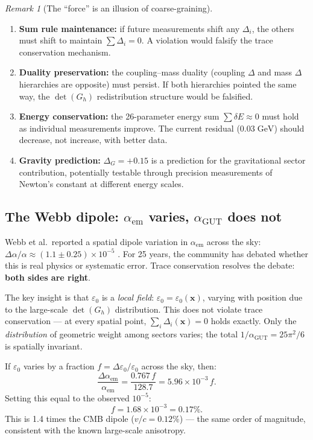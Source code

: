\documentclass[12pt]{article}
\theoremstyle{remark}
\newtheorem{remark}[theorem]{Remark}
\theoremstyle{definition}
\begin{document}
\begin{remark}[The ``force'' is an illusion of coarse-graining]
\begin{enumerate}
\item \textbf{Sum rule maintenance:} if future measurements shift any $\Delta_i$, the others must shift to maintain $\sum \Delta_i = 0$. A violation would falsify the trace conservation mechanism.

\item \textbf{Duality preservation:} the coupling--mass duality (coupling $\Delta$ and mass $\Delta$ hierarchies are opposite) must persist. If both hierarchies pointed the same way, the $\det(G_h)$ redistribution structure would be falsified.

\item \textbf{Energy conservation:} the 26-parameter energy sum $\sum \delta E \approx 0$ must hold as individual measurements improve. The current residual ($0.03\;\text{GeV}$) should decrease, not increase, with better data.

\item \textbf{Gravity prediction:} $\Delta_G = +0.15$ is a prediction for the gravitational sector contribution, potentially testable through precision measurements of Newton's constant at different energy scales.
\end{enumerate}

\subsection{The Webb dipole: $\alpha_\text{em}$ varies, $\alpha_\text{GUT}$ does not}

Webb et al.\ reported a spatial dipole variation in $\alpha_\text{em}$ across the sky: $\Delta\alpha/\alpha \approx (1.1 \pm 0.25) \times 10^{-5}$ \cite{Webb}. For 25 years, the community has debated whether this is real physics or systematic error. Trace conservation resolves the debate: \textbf{both sides are right}.

The key insight is that $\varepsilon_0$ is a \emph{local field}: $\varepsilon_0 = \varepsilon_0(\mathbf{x})$, varying with position due to the large-scale $\det(G_h)$ distribution. This does not violate trace conservation --- at every spatial point, $\sum_i \Delta_i(\mathbf{x}) = 0$ holds exactly. Only the \emph{distribution} of geometric weight among sectors varies; the total $1/\alpha_\text{GUT} = 25\pi^2/6$ is spatially invariant.

If $\varepsilon_0$ varies by a fraction $f = \Delta\varepsilon_0/\varepsilon_0$ across the sky, then:
\begin{equation}
\frac{\Delta\alpha_\text{em}}{\alpha_\text{em}} = \frac{0.767\,f}{128.7} = 5.96 \times 10^{-3}\,f.
\end{equation}
Setting this equal to the observed $10^{-5}$:
\begin{equation}
f = 1.68 \times 10^{-3} = 0.17\%.
\end{equation}
This is 1.4 times the CMB dipole ($v/c = 0.12\%$) --- the same order of magnitude, consistent with the known large-scale anisotropy.


\end{remark}
\end{document}
